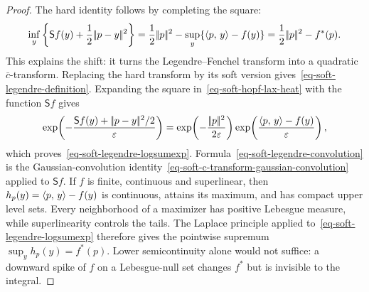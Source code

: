 \begin{proof}
The hard identity follows by completing the square:
\[
	\inf_y\left\{\mathsf S f(y)+\frac12|\!| p-y |\!|^2\right\}
	=
	\frac12|\!| p |\!|^2-
	\sup_y\{\langle p,\,y\rangle-f(y)\}
	=
	\frac12|\!| p |\!|^2-f^*(p).
\]
This explains the shift: it turns the Legendre--Fenchel transform into a quadratic $\bar c$-transform. Replacing the hard transform by its soft version gives~\eqref{eq-soft-legendre-definition}. Expanding the square in~\eqref{eq-soft-hopf-lax-heat} with the function $\mathsf S f$ gives
\[
	\exp\!\left(-\frac{\mathsf S f(y)+|\!| p-y |\!|^2/2}{\varepsilon}\right)
	=
	\exp\!\left(-\frac{|\!| p |\!|^2}{2\varepsilon}\right)
	\exp\!\left(\frac{\langle p,\,y\rangle-f(y)}{\varepsilon}\right),
\]
which proves~\eqref{eq-soft-legendre-logsumexp}. Formula~\eqref{eq-soft-legendre-convolution} is the Gaussian-convolution identity~\eqref{eq-soft-c-transform-gaussian-convolution} applied to $\mathsf S f$. If $f$ is finite, continuous and superlinear, then $h_p(y)=\langle p,\,y\rangle-f(y)$ is continuous, attains its maximum, and has compact upper level sets. Every neighborhood of a maximizer has positive Lebesgue measure, while superlinearity controls the tails. The Laplace principle applied to~\eqref{eq-soft-legendre-logsumexp} therefore gives the pointwise supremum $\sup_y h_p(y)=f^*(p)$. Lower semicontinuity alone would not suffice: a downward spike of $f$ on a Lebesgue-null set changes $f^*$ but is invisible to the integral.
\end{proof}

